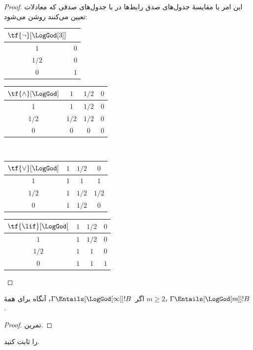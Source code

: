 \documentclass[../../../include/open-logic-section]{subfiles}
\begin{document}
\begin{proof}
  این امر با مقایسهٔ جدول‌های صدق رابط‌ها در
   با جدول‌های صدقی که معادلات
   تعیین می‌کنند روشن می‌شود:
  \begin{center}
    \begin{tabular}{c|c} 
      $\tf{\lnot}[\LogGod[3]]$ & \\ 
      \hline  
      $1$ & $0$ \\ 
      $1/2$ & $0$ \\
      $0$ & $1$ 
    \end{tabular}
    \quad
    \begin{tabular}{c|ccc} 
      $\tf{\land}[\LogGod]$ & $1$ & $1/2$ & $0$ \\ 
      \hline 
      $1$ & $1$ & $1/2$ & $0$ \\ 
      $1/2$ & $1/2$ & $1/2$ & $0$\\ 
      $0$ & $0$ & $0$ & $0$ 
    \end{tabular}
    \\[2ex]
    \begin{tabular}{c|ccc} 
      $\tf{\lor}[\LogGod]$ & $1$ & $1/2$ & $0$ \\ 
      \hline 
      $1$ & $1$ & $1$ & $1$ \\ 
      $1/2$ & $1$ & $1/2$ & $1/2$ \\
      $0$ & $1$ & $1/2$ & $0$ 
    \end{tabular}
    \quad
    \begin{tabular}{c|ccc} 
      $\tf{\lif}[\LogGod]$ & $1$ & $1/2$ & $0$ \\ 
      \hline 
      $1$ & $1$ & $1/2$ & $0$ \\ 
      $1/2$ & $1$ & $1$ & $0$  \\ 
      $0$ & $1$ & $1$ & $1$ 
    \end{tabular}
  \end{center} 
\end{proof}

\begin{prop}
  اگر~$\Gamma \Entails[\LogGod[\infty]] !B$، آنگاه برای همهٔ
  $m \ge 2$، $\Gamma \Entails[\LogGod[m]] !B$.
\end{prop}

\begin{proof}
  تمرین.
\end{proof}

\begin{prob}
   را ثابت کنید.
\end{prob}
\end{document}
